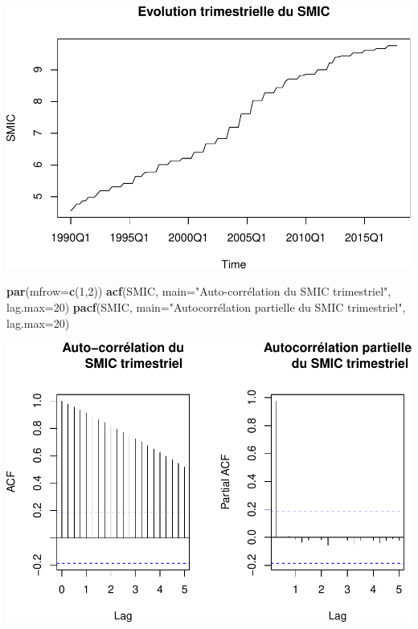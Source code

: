 \documentclass[11pt,]{article}
\newenvironment{Shaded}{\begin{snugshade}}{\end{snugshade}}
\newcommand{\KeywordTok}[1]{\textcolor[rgb]{0.13,0.29,0.53}{\textbf{{#1}}}}
\newcommand{\DataTypeTok}[1]{\textcolor[rgb]{0.13,0.29,0.53}{{#1}}}
\newcommand{\DecValTok}[1]{\textcolor[rgb]{0.00,0.00,0.81}{{#1}}}
\newcommand{\StringTok}[1]{\textcolor[rgb]{0.31,0.60,0.02}{{#1}}}
\newcommand{\NormalTok}[1]{{#1}}
\begin{document}
\includegraphics{doc_files/figure-latex/unnamed-chunk-4-1.pdf}

\begin{Shaded}
\begin{Highlighting}[]
  \KeywordTok{par}\NormalTok{(}\DataTypeTok{mfrow=}\KeywordTok{c}\NormalTok{(}\DecValTok{1}\NormalTok{,}\DecValTok{2}\NormalTok{))}
  \KeywordTok{acf}\NormalTok{(SMIC, }\DataTypeTok{main=}\StringTok{"Auto-corrélation du}
\StringTok{      SMIC trimestriel"}\NormalTok{, }\DataTypeTok{lag.max=}\DecValTok{20}\NormalTok{)}
  \KeywordTok{pacf}\NormalTok{(SMIC, }\DataTypeTok{main=}\StringTok{"Autocorrélation partielle}
\StringTok{       du SMIC trimestriel"}\NormalTok{, }\DataTypeTok{lag.max=}\DecValTok{20}\NormalTok{)}
\end{Highlighting}
\end{Shaded}

\includegraphics{doc_files/figure-latex/unnamed-chunk-4-2.pdf}
\end{document}
